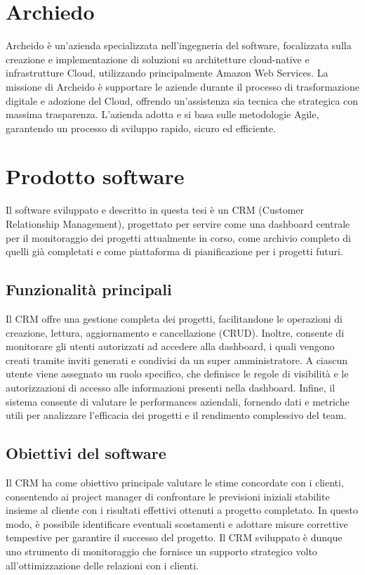 \documentclass[target=bach,aauheader=,style=]{thud}
\begin{document}
\section{Archiedo}
Archeido \cite{archeido2024} è un'azienda specializzata nell'ingegneria del software, focalizzata sulla creazione e implementazione di soluzioni su architetture cloud-native e infrastrutture Cloud, utilizzando principalmente Amazon Web Services. La missione di Archeido è supportare le aziende durante il processo di trasformazione digitale e adozione del Cloud, offrendo un'assistenza sia tecnica che strategica con massima trasparenza. L'azienda adotta e si basa sulle metodologie Agile, garantendo un processo di sviluppo rapido, sicuro ed efficiente.

\section{Prodotto software}
Il software sviluppato e descritto in questa tesi è un CRM (Customer Relationship Management), progettato per servire come una dashboard centrale per il monitoraggio dei progetti attualmente in corso, come archivio completo di quelli già completati e come piattaforma di pianificazione per i progetti futuri.

\subsection{Funzionalità principali}
Il CRM offre una gestione completa dei progetti, facilitandone le operazioni di creazione, lettura, aggiornamento e cancellazione (CRUD). Inoltre, consente di monitorare gli utenti autorizzati ad accedere alla dashboard, i quali vengono creati tramite inviti generati e condivisi da un super amministratore. A ciascun utente viene assegnato un ruolo specifico, che definisce le regole di visibilità e le autorizzazioni di accesso alle informazioni presenti nella dashboard. Infine, il sistema consente di valutare le performances aziendali, fornendo dati e metriche utili per analizzare l'efficacia dei progetti e il rendimento complessivo del team.

\subsection{Obiettivi del software}
Il CRM ha come obiettivo principale valutare le stime concordate con i clienti, consentendo ai project manager di confrontare le previsioni iniziali stabilite insieme al cliente con i risultati effettivi ottenuti a progetto completato. In questo modo, è possibile identificare eventuali scostamenti e adottare misure correttive tempestive per garantire il successo del progetto. Il CRM sviluppato è dunque uno strumento di monitoraggio che fornisce un supporto strategico volto all'ottimizzazione delle relazioni con i clienti.
\end{document}
